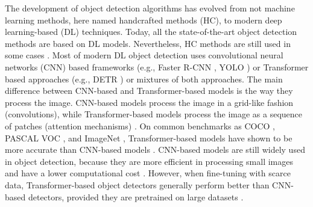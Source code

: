 \documentclass[journal,article,submit,pdftex,moreauthors]{Definitions/mdpi}
\begin{document}
The development of object detection algorithms has evolved from not machine learning methods, 
here named handcrafted methods (HC), to modern deep learning-based (DL) techniques.
Today, all the state-of-the-art object detection methods are based on DL models. 
Nevertheless, HC methods are still used in some cases 
\cite{davidPlantDetectionCounting2021,garcia-martinezDigitalCountCorn2020}. 
Most of modern DL object detection uses convolutional neural networks (CNN) \cite{lecunDeepLearning2015} based 
frameworks (e.g., Faster R-CNN \cite{FasterRCNNRealTime}, YOLO \cite{YouOnlyLook}) 
or Transformer \cite{vaswaniAttentionAllYou2017} based approaches (e.g., DETR \cite{carionEndtoEndObjectDetection2020})
or mixtures of both approaches.
The main difference between CNN-based and Transformer-based models is the way they
process the image. CNN-based models process the image in a grid-like fashion (convolutions),
while Transformer-based models process the image as a sequence of patches (attention mechanisms) \cite{dosovitskiyImageWorth16x162021}.
On common benchmarks as COCO \cite{linMicrosoftCOCOCommon2015}, PASCAL VOC \cite{jingSelfsupervisedVisualFeature2019}, 
and ImageNet \cite{14090575ImageNetLarge}, Transformer-based models have shown 
to be more accurate than CNN-based models \cite{zongDETRsCollaborativeHybrid2023} .
CNN-based models are still widely used in object detection, because they are
more efficient in processing small images and have a lower computational cost \cite{khanSurveyVisionTransformers2023}.
However, when fine-tuning with scarce data, Transformer-based object detectors generally 
perform better than CNN-based detectors, provided they are pretrained on large datasets \cite{rekavandiTransformersSmallObject2023,liTransformerObjectDetection2023,amjoudObjectDetectionUsing2023}.
\end{document}
